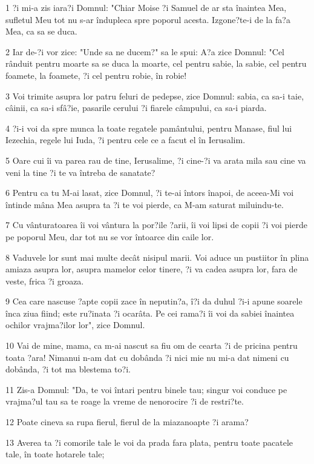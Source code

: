 \par 1 ?i mi-a zis iara?i Domnul: "Chiar Moise ?i Samuel de ar sta înaintea Mea, sufletul Meu tot nu s-ar îndupleca spre poporul acesta. Izgone?te-i de la fa?a Mea, ca sa se duca.
\par 2 Iar de-?i vor zice: "Unde sa ne ducem?" sa le spui: A?a zice Domnul: "Cel rânduit pentru moarte sa se duca la moarte, cel pentru sabie, la sabie, cel pentru foamete, la foamete, ?i cel pentru robie, în robie!
\par 3 Voi trimite asupra lor patru feluri de pedepse, zice Domnul: sabia, ca sa-i taie, câinii, ca sa-i sfâ?ie, pasarile cerului ?i fiarele câmpului, ca sa-i piarda.
\par 4 ?i-i voi da spre munca la toate regatele pamântului, pentru Manase, fiul lui Iezechia, regele lui Iuda, ?i pentru cele ce a facut el în Ierusalim.
\par 5 Oare cui îi va parea rau de tine, Ierusalime, ?i cine-?i va arata mila sau cine va veni la tine ?i te va întreba de sanatate?
\par 6 Pentru ca tu M-ai lasat, zice Domnul, ?i te-ai întors înapoi, de aceea-Mi voi întinde mâna Mea asupra ta ?i te voi pierde, ca M-am saturat miluindu-te.
\par 7 Cu vânturatoarea îi voi vântura la por?ile ?arii, îi voi lipsi de copii ?i voi pierde pe poporul Meu, dar tot nu se vor întoarce din caile lor.
\par 8 Vaduvele lor sunt mai multe decât nisipul marii. Voi aduce un pustiitor în plina amiaza asupra lor, asupra mamelor celor tinere, ?i va cadea asupra lor, fara de veste, frica ?i groaza.
\par 9 Cea care nascuse ?apte copii zace în neputin?a, î?i da duhul ?i-i apune soarele înca ziua fiind; este ru?inata ?i ocarâta. Pe cei rama?i îi voi da sabiei înaintea ochilor vrajma?ilor lor", zice Domnul.
\par 10 Vai de mine, mama, ca m-ai nascut sa fiu om de cearta ?i de pricina pentru toata ?ara! Nimanui n-am dat cu dobânda ?i nici mie nu mi-a dat nimeni cu dobânda, ?i tot ma blestema to?i.
\par 11 Zis-a Domnul: "Da, te voi întari pentru binele tau; singur voi conduce pe vrajma?ul tau sa te roage la vreme de nenorocire ?i de restri?te.
\par 12 Poate cineva sa rupa fierul, fierul de la miazanoapte ?i arama?
\par 13 Averea ta ?i comorile tale le voi da prada fara plata, pentru toate pacatele tale, în toate hotarele tale;
